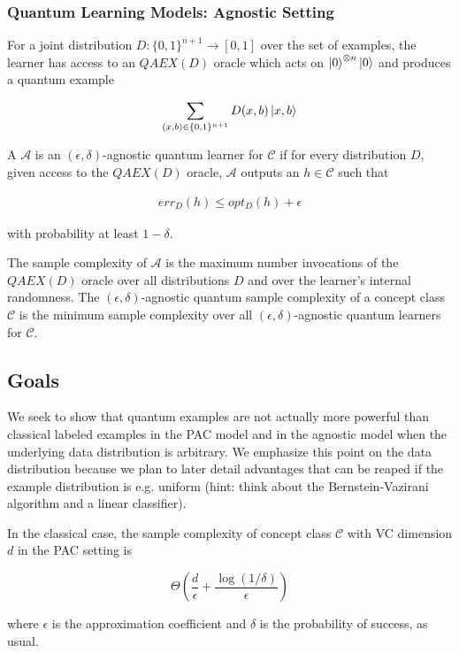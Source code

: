 \documentclass[main.tex]{subfiles}
\begin{document}
\subsubsection{Quantum Learning Models: Agnostic Setting}

For a joint distribution $D : \{0, 1\}^{n+1} \rightarrow [0, 1]$ over the set of examples, the learner has access to an $QAEX(D)$ oracle which acts on $\ket{0}^{\otimes n}\ket{0}$ and produces a quantum example 

\begin{align}
\sum_{(x, b)\in\{0,1\}^{n+1}} D(x,b)\ket{x,b}	
\end{align} 

A $\mathcal{A}$ is an $(\epsilon, \delta)$-agnostic quantum learner for $\mathcal{C}$ if for every distribution $D$, given access to the $QAEX(D)$ oracle, $\mathcal{A}$  outputs an $h \in \mathcal{C}$ such that 

\begin{align}
err_D (h) \leq opt_D(h) + \epsilon	
\end{align}

with probability at least $1 - \delta$.

The sample complexity of $\mathcal{A}$ is the maximum number invocations of the $QAEX(D)$ oracle over all distributions $D$ and over the learner’s internal randomness. The $(\epsilon, \delta)$-agnostic quantum sample complexity of a concept class $\mathcal{C}$ is the minimum sample complexity over all $(\epsilon, \delta)$-agnostic quantum learners for $\mathcal{C}$.

\subsection{Goals}

We seek to show that quantum examples are not actually more powerful than classical labeled examples in the PAC model and in the agnostic model when the underlying data distribution is arbitrary. We emphasize this point on the data distribution because we plan to later detail advantages that can be reaped if the example distribution is e.g. uniform (hint: think about the Bernstein-Vazirani algorithm and a linear classifier).

In the classical case, the sample complexity of concept class $\mathcal{C}$ with VC dimension $d$ in the PAC setting is

$$
\Theta(\frac{d}{\epsilon} + \frac{\log(1/\delta)}{\epsilon})
$$

where $\epsilon$ is the approximation coefficient and $\delta$ is the probability of success, as usual.
\end{document}
